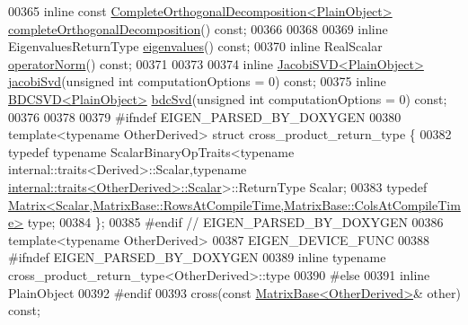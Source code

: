 \begin{DoxyCode}
00365     \textcolor{keyword}{inline} \textcolor{keyword}{const} \hyperlink{group___q_r___module_class_eigen_1_1_complete_orthogonal_decomposition}{CompleteOrthogonalDecomposition<PlainObject>} 
      \hyperlink{group___core___module_ae90b6846f05bd30b8d52b66e427e3e09}{completeOrthogonalDecomposition}() \textcolor{keyword}{const};
00366 
00368 
00369     \textcolor{keyword}{inline} EigenvaluesReturnType \hyperlink{group___core___module_a30430fa3d5b4e74d312fd4f502ac984d}{eigenvalues}() \textcolor{keyword}{const};
00370     \textcolor{keyword}{inline} RealScalar \hyperlink{group___core___module_a0ff9bc0b9bea2d0822a2bf3192783102}{operatorNorm}() \textcolor{keyword}{const};
00371 
00373 
00374     \textcolor{keyword}{inline} \hyperlink{group___s_v_d___module_class_eigen_1_1_jacobi_s_v_d}{JacobiSVD<PlainObject>} \hyperlink{group___core___module_a5745dca9c54390633b434e54a1d1eedd}{jacobiSvd}(\textcolor{keywordtype}{unsigned} \textcolor{keywordtype}{int} computationOptions 
      = 0) \textcolor{keyword}{const};
00375     \textcolor{keyword}{inline} \hyperlink{group___s_v_d___module_class_eigen_1_1_b_d_c_s_v_d}{BDCSVD<PlainObject>}    \hyperlink{group___core___module_ae171b74b5d530846ee0836135ffcf837}{bdcSvd}(\textcolor{keywordtype}{unsigned} \textcolor{keywordtype}{int} computationOptions = 0) \textcolor{keyword}{
      const};
00376 
00378 
00379 \textcolor{preprocessor}{    #ifndef EIGEN\_PARSED\_BY\_DOXYGEN}
00380     \textcolor{keyword}{template}<\textcolor{keyword}{typename} OtherDerived> \textcolor{keyword}{struct }cross\_product\_return\_type \{
00382       \textcolor{keyword}{typedef} \textcolor{keyword}{typename} ScalarBinaryOpTraits<typename internal::traits<Derived>::Scalar,\textcolor{keyword}{typename} 
      \hyperlink{struct_eigen_1_1internal_1_1traits}{internal::traits<OtherDerived>::Scalar}>::ReturnType Scalar;
00383       \textcolor{keyword}{typedef} 
      \hyperlink{group___core___module_class_eigen_1_1_matrix}{Matrix<Scalar,MatrixBase::RowsAtCompileTime,MatrixBase::ColsAtCompileTime>}
       type;
00384     \};
00385 \textcolor{preprocessor}{    #endif // EIGEN\_PARSED\_BY\_DOXYGEN}
00386     \textcolor{keyword}{template}<\textcolor{keyword}{typename} OtherDerived>
00387     EIGEN\_DEVICE\_FUNC
00388 \textcolor{preprocessor}{#ifndef EIGEN\_PARSED\_BY\_DOXYGEN}
00389     \textcolor{keyword}{inline} \textcolor{keyword}{typename} cross\_product\_return\_type<OtherDerived>::type
00390 \textcolor{preprocessor}{#else}
00391     \textcolor{keyword}{inline} PlainObject
00392 \textcolor{preprocessor}{#endif}
00393     cross(\textcolor{keyword}{const} \hyperlink{group___core___module_class_eigen_1_1_matrix_base}{MatrixBase<OtherDerived>}& other) \textcolor{keyword}{const};

\end{DoxyCode}
